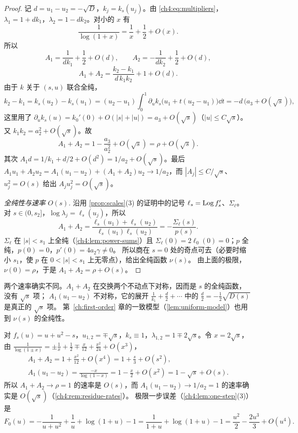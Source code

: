 \begin{proof}
记 $d=u_1-u_2=-\sqrt{D}$，$k_j=k_s(u_j)$。由 \eqref{ch4:eq:multipliers}，
$\lambda_1=1+dk_1$，$\lambda_2=1-dk_2$。对小的 $x$ 有
\[
 \frac1{\log(1+x)}=\frac1x+\frac12+O(x).
\]
所以
\[
 A_1=\frac1{dk_1}+\frac12+O(d),\qquad A_2=-\frac1{dk_2}+\frac12+O(d),
\]
\[
 A_1+A_2=\frac{k_2-k_1}{d\,k_1k_2}+1+O(d).
\]
由于 $k$ 关于 $(s,u)$ 联合全纯，
\[
 k_2-k_1=k_s(u_2)-k_s(u_1)=(u_2-u_1)\int_0^1\partial_uk_s\bigl(u_1+t(u_2-u_1)\bigr)\dd t
 =-d\,\bigl(a_3+O(\sqrt s)\bigr),
\]
这里用了 $\partial_uk_s(u)=k_0'(0)+O(|s|+|u|)=a_3+O(\sqrt s)$（$|u|\le C\sqrt s$）。又 $k_1k_2=a_2^2+O(\sqrt s)$。故
\[
 A_1+A_2=1-\frac{a_3}{a_2^2}+O(\sqrt s)=\rho+O(\sqrt s).
\]
其次 $A_1d=1/k_1+d/2+O(d^2)=1/a_2+O(\sqrt s)$。最后
$A_1u_1+A_2u_2=A_1(u_1-u_2)+(A_1+A_2)u_2\to1/a_2$，而 $|A_j|\le C/\sqrt s$、$u_j^2=O(s)$ 给出 $A_ju_j^2=O(\sqrt s)$。

\emph{全纯性与速率 $O(s)$.} 沿用 \cref{prop:scales}(3) 的证明中的记号 $\ell_s=\operatorname{Log} f_s'$、$\Sigma_\ell$。
对 $s\in(0,s_2]$，$\log\lambda_j=\ell_s(u_j)$，所以
\[
 A_1+A_2=\frac{\ell_s(u_1)+\ell_s(u_2)}{\ell_s(u_1)\ell_s(u_2)}=-\frac{\Sigma_\ell(s)}{p(s)} .
\]
$\Sigma_\ell$ 在 $|s|<s_1$ 上全纯（\cref{ch4:lem:power-sums}）且 $\Sigma_\ell(0)=2\ell_0(0)=0$；$p$ 全纯，$p(0)=0$，$p'(0)=4a_2\gamma\ne0$。
所以商在 $s=0$ 处的奇点可去（必要时缩小 $s_1$，使 $p$ 在 $0<|s|<s_1$ 上无零点），给出全纯函数 $\nu(s)$。
由上面的极限，$\nu(0)=\rho$，于是 $A_1+A_2=\rho+O(s)$。
\end{proof}

\begin{remark}\label{ch4:rem:residue-rates}
两个速率确实不同。$A_1+A_2$ 在交换两个不动点下对称，因而是 $s$ 的全纯函数，没有 $\sqrt s$ 项；
$A_1(u_1-u_2)$ 不对称，它的展开 $\frac1{k_1}+\frac d2+\cdots$ 中的 $\frac d2=-\frac12\sqrt{D(s)}$ 是真正的 $\sqrt s$ 项。
第~\ref{ch:first-order} 章的一致模型（\cref{lem:uniform-model}）也用到 $\nu(s)$ 的全纯性。
\end{remark}

\begin{example}[二次族的精确计算]\label{ch4:exa:quad-exact}
对 $f_s(u)=u+u^2-s$，$u_{1,2}=\mp\sqrt s$，$k_s\equiv1$，$\lambda_{1,2}=1\mp2\sqrt s$。令 $x=2\sqrt s$，由
$\frac1{\log(1\pm x)}=\pm\frac1x+\frac12\mp\frac x{12}+\frac{x^2}{24}+O(x^3)$，
\begin{gather*}
 A_1+A_2=1+\frac{x^2}{12}+O(x^4)=1+\frac s3+O(s^2),\\
 A_1(u_1-u_2)=\frac{-x}{\log(1-x)}=1-\frac x2+O(x^2)=1-\sqrt s+O(s).
\end{gather*}
所以 $A_1+A_2\to\rho=1$ 的速率是 $O(s)$，而 $A_1(u_1-u_2)\to1/a_2=1$ 的速率确实是 $O(\sqrt s)$（\cref{ch4:rem:residue-rates}）。
极限一步误差（\cref{ch4:lem:one-step}(3)）是
\[
 F_0(u)=-\frac1{u+u^2}+\frac1u+\log(1+u)-1=\frac1{1+u}+\log(1+u)-1=\frac{u^2}2-\frac{2u^3}3+O(u^4).
\]
\end{example}

